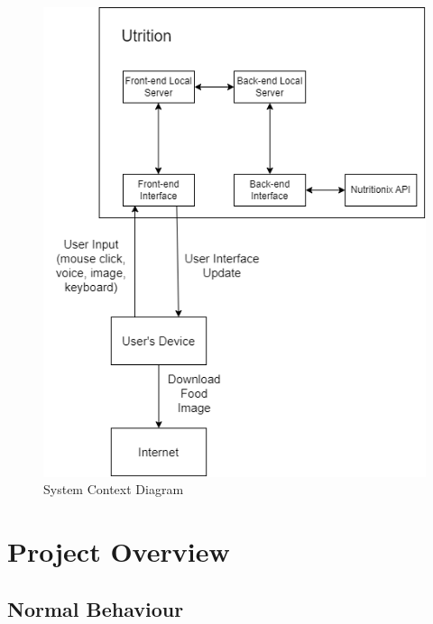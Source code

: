 \documentclass[12pt, titlepage]{article}
\begin{document}
\begin{figure}[H]
	\centering
	\includegraphics[scale=0.8]{System_Context_Diagram.png}
	\caption{System Context Diagram}
\end{figure}


\section{Project Overview}

\subsection{Normal Behaviour}
\end{document}
